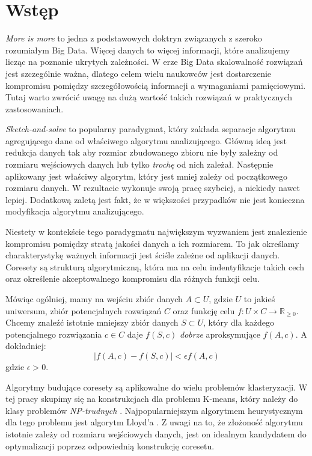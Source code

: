 \chapter{Wstęp}
\textit{More is more} to jedna z podstawowych doktryn związanych z szeroko rozumiałym Big Data.
Więcej danych to więcej informacji, które analizujemy licząc na poznanie ukrytych zależności.
W erze Big Data skalowalność rozwiązań jest szczególnie ważna, dlatego celem wielu naukowców jest dostarczenie kompromisu pomiędzy szczegółowością informacji a wymaganiami pamięciowymi.
Tutaj warto zwrócić uwagę na dużą wartość takich rozwiązań w praktycznych zastosowaniach.

\textit{Sketch-and-solve} to popularny paradygmat, który zakłada separacje algorytmu agregującego dane od właściwego algorytmu analizującego.
Główną ideą jest redukcja danych tak aby rozmiar zbudowanego zbioru nie były zależny od rozmiaru wejściowych danych lub tylko \textit{trochę} od nich zależał.
Następnie aplikowany jest właściwy algorytm, który jest mniej zależy od początkowego rozmiaru danych.
W rezultacie wykonuje swoją pracę szybciej, a niekiedy nawet lepiej.
Dodatkową zaletą jest fakt, że w większości przypadków nie jest konieczna modyfikacja algorytmu analizującego.

Niestety w kontekście tego paradygmatu największym wyzwaniem jest znalezienie kompromisu pomiędzy stratą jakości danych a ich rozmiarem.
To jak określamy charakterystykę ważnych informacji jest ściśle zależne od aplikacji danych.
Coresety są strukturą algorytmiczną, która ma na celu indentyfikacje takich cech oraz określenie akceptowalnego kompromisu dla różnych funkcji celu.

Mówiąc ogólniej, mamy na wejściu zbiór danych $A \subset U$, gdzie $U$ to jakieś uniwersum, zbiór potencjalnych rozwiązań $C$ oraz funkcję celu $f:U \times C \rightarrow \mathbb{R}_{\geq0}$.
Chcemy znaleźć istotnie mniejszy zbiór danych $S \subset U$, który dla każdego potencjalnego rozwiązania $c \in C$ daje $f(S, c)$ \textit{dobrze} aproksymujące $f(A,c)$.
A dokładniej:
\begin{equation}
    |f(A,c) - f(S,c)| < \epsilon f(A,c)
\end{equation}
\noindent
gdzie $\epsilon > 0$.

Algorytmy budujące coresety są aplikowalne do wielu problemów klasteryzacji.
W tej pracy skupimy się na konstrukcjach dla problemu K-means, który należy do klasy problemów \textit{NP-trudnych} \cite{article}.
Najpopularniejszym algorytmem heurystycznym dla tego problemu jest algorytm Lloyd'a \cite{1056489}.
Z uwagi na to, że złożoność algorytmu istotnie zależy od rozmiaru wejściowych danych, jest on idealnym kandydatem do optymalizacji poprzez odpowiednią konstrukcję coresetu.